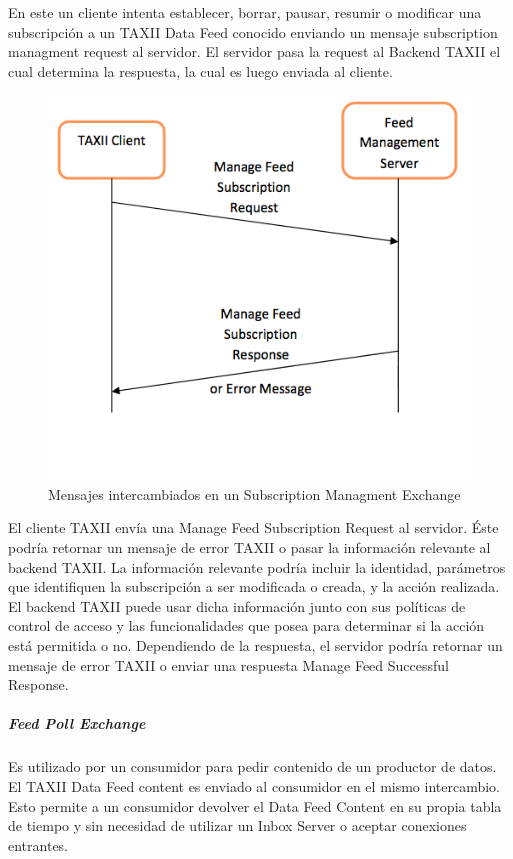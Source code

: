 En este un cliente intenta establecer, borrar, pausar, resumir o modificar una 
subscripción a un TAXII Data Feed conocido enviando un mensaje subscription 
managment request al servidor. El servidor pasa la request al Backend TAXII el 
cual determina la respuesta, la cual es luego enviada al cliente.

\begin{figure}[ht!]
  \centering
    \includegraphics[width=150mm]{./images/SubscriptionManagmentExchange.png}
    \caption{Mensajes intercambiados en un Subscription Managment Exchange \protect\cite{b1}} 
\end{figure}

El cliente TAXII envía una Manage Feed Subscription Request al servidor. Éste 
podría retornar un mensaje de error TAXII o pasar la información relevante al 
backend TAXII. La información relevante podría incluir la identidad, parámetros 
que identifiquen la subscripción a ser modificada o creada, y la acción 
realizada. El backend TAXII puede usar dicha información junto con sus 
políticas de control de acceso y las funcionalidades que posea para determinar 
si la acción está permitida o no. Dependiendo de la respuesta, el servidor 
podría retornar un mensaje de error TAXII o enviar una respuesta Manage Feed 
Successful Response.

\subparagraph{Feed Poll Exchange}

Es utilizado por un consumidor para pedir contenido de un productor de datos. El 
TAXII Data Feed content es enviado al consumidor en el mismo intercambio. Esto  
permite a un consumidor devolver el Data Feed Content en su propia tabla de 
tiempo y sin necesidad de utilizar un Inbox Server o aceptar conexiones 
entrantes.

